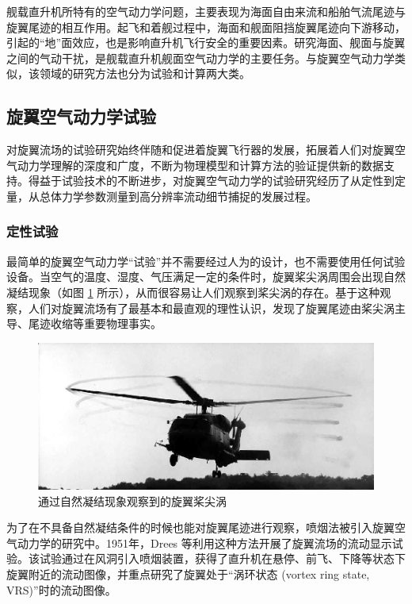 舰载直升机所特有的空气动力学问题，主要表现为海面自由来流和船舶气流尾迹与旋翼尾迹的相互作用。起飞和着舰过程中，海面和舰面阻挡旋翼尾迹向下游移动，引起的“地”面效应，也是影响直升机飞行安全的重要因素。研究海面、舰面与旋翼之间的气动干扰，是舰载直升机舰面空气动力学的主要任务。与旋翼空气动力学类似，该领域的研究方法也分为试验和计算两大类。

\subsection{旋翼空气动力学试验}

对旋翼流场的试验研究始终伴随和促进着旋翼飞行器的发展，拓展着人们对旋翼空气动力学理解的深度和广度，不断为物理模型和计算方法的验证提供新的数据支持。得益于试验技术的不断进步，对旋翼空气动力学的试验研究经历了从定性到定量，从总体力学参数测量到高分辨率流动细节捕捉的发展过程。

\subsubsection{定性试验}

最简单的旋翼空气动力学“试验”并不需要经过人为的设计，也不需要使用任何试验设备。当空气的温度、湿度、气压满足一定的条件时，旋翼桨尖涡周围会出现自然凝结现象（如图
\ref{fig:natural-condensation} 所示），从而很容易让人们观察到桨尖涡的存在。基于这种观察，人们对旋翼流场有了最基本和最直观的理性认识，发现了旋翼尾迹由桨尖涡主导、尾迹收缩等重要物理事实。
\begin{figure}[h!]
\begin{centering}
\includegraphics[width=1\textwidth]{../review/figures/natural-condensation}
\par\end{centering}
\caption{\label{fig:natural-condensation}通过自然凝结现象观察到的旋翼桨尖涡}
\end{figure}

为了在不具备自然凝结条件的时候也能对旋翼尾迹进行观察，喷烟法被引入旋翼空气动力学的研究中。1951年，Drees 等利用这种方法开展了旋翼流场的流动显示试验。该试验通过在风洞引入喷烟装置，获得了直升机在悬停、前飞、下降等状态下旋翼附近的流动图像，并重点研究了旋翼处于“涡环状态
(vortex ring state, VRS)”时的流动图像。

